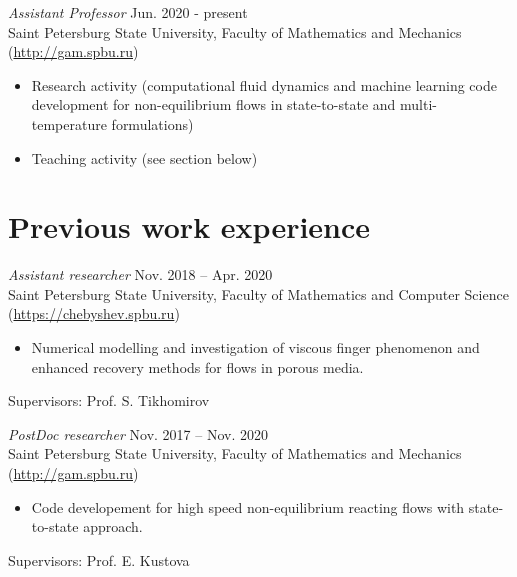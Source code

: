 \documentclass[11pt]{res} %
\begin{document}
\begin{resume}


{\sl Assistant Professor} \hfill  Jun. 2020 - present \\
Saint Petersburg State University, Faculty of Mathematics and Mechanics (\url{http://gam.spbu.ru}) \\
\vspace{-0.4cm}
\begin{itemize} \itemsep -2pt
\item Research activity (computational fluid dynamics and machine learning code development for non-equilibrium flows in state-to-state and multi-temperature formulations)
\item Teaching activity (see section below)
\end{itemize}

\section{{Previous work experience}}

{\sl Assistant researcher} \hfill  Nov. 2018 -- Apr. 2020 \\
Saint Petersburg State University, Faculty of Mathematics and Computer Science \\ (\url{https://chebyshev.spbu.ru}) \\
\vspace{-0.4cm}
\begin{itemize} \itemsep -2pt
\item Numerical modelling and investigation of viscous finger phenomenon and enhanced recovery methods for flows in porous media.
\end{itemize}
\vspace{-0.4cm}
Supervisors: Prof.  S. Tikhomirov

{\sl PostDoc researcher} \hfill  Nov. 2017 -- Nov. 2020 \\
Saint Petersburg State University, Faculty of Mathematics and Mechanics (\url{http://gam.spbu.ru}) \\
\vspace{-0.4cm}
\begin{itemize} \itemsep -2pt
\item Code developement for high speed non-equilibrium reacting flows with state-to-state
approach.
\end{itemize}
\vspace{-0.4cm}
Supervisors: Prof.  E. Kustova


\end{resume}
\end{document}

